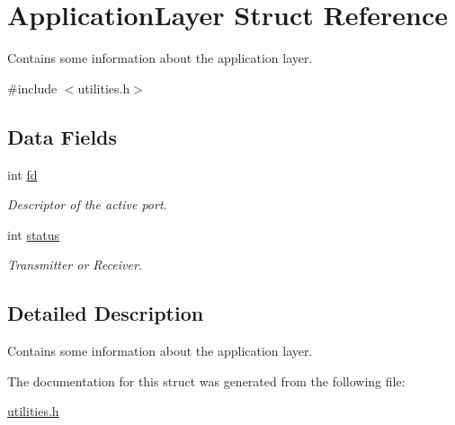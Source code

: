 \hypertarget{struct_application_layer}{\section{Application\-Layer Struct Reference}
\label{struct_application_layer}
}


Contains some information about the application layer.  




{\ttfamily \#include $<$utilities.\-h$>$}

\subsection*{Data Fields}
\begin{DoxyCompactItemize}
\item 
\hypertarget{struct_application_layer_a27603936f9300b3aea40aedfb65b069d}{int \hyperlink{struct_application_layer_a27603936f9300b3aea40aedfb65b069d}{fd}}\label{struct_application_layer_a27603936f9300b3aea40aedfb65b069d}

\begin{DoxyCompactList}\small\item\em Descriptor of the active port. \end{DoxyCompactList}\item 
\hypertarget{struct_application_layer_a0bb827ee4d01953285781ae434fbc7aa}{int \hyperlink{struct_application_layer_a0bb827ee4d01953285781ae434fbc7aa}{status}}\label{struct_application_layer_a0bb827ee4d01953285781ae434fbc7aa}

\begin{DoxyCompactList}\small\item\em Transmitter or Receiver. \end{DoxyCompactList}\end{DoxyCompactItemize}


\subsection{Detailed Description}
Contains some information about the application layer. 

The documentation for this struct was generated from the following file\-:\begin{DoxyCompactItemize}
\item 
\hyperlink{utilities_8h}{utilities.\-h}\end{DoxyCompactItemize}
